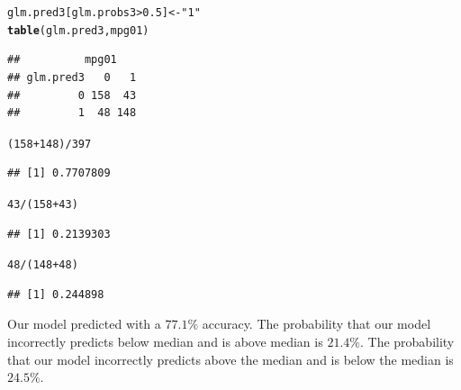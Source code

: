 \documentclass{article}\usepackage[]{graphicx}\usepackage[]{color}
\makeatletter
\newcommand{\hlnum}[1]{\textcolor[rgb]{0.686,0.059,0.569}{#1}}%
\newcommand{\hlstr}[1]{\textcolor[rgb]{0.192,0.494,0.8}{#1}}%
\newcommand{\hlopt}[1]{\textcolor[rgb]{0,0,0}{#1}}%
\newcommand{\hlstd}[1]{\textcolor[rgb]{0.345,0.345,0.345}{#1}}%
\newcommand{\hlkwb}[1]{\textcolor[rgb]{0.69,0.353,0.396}{#1}}%
\newcommand{\hlkwd}[1]{\textcolor[rgb]{0.737,0.353,0.396}{\textbf{#1}}}%
\newenvironment{kframe}{%
 \def\at@end@of@kframe{}%
 \ifinner\ifhmode%
  \def\at@end@of@kframe{\end{minipage}}%
  \begin{minipage}{\columnwidth}%
 \fi\fi%
 \def\FrameCommand##1{\hskip\@totalleftmargin \hskip-\fboxsep
 \colorbox{shadecolor}{##1}\hskip-\fboxsep
     \hskip-\linewidth \hskip-\@totalleftmargin \hskip\columnwidth}%
 \MakeFramed {\advance\hsize-\width
   \@totalleftmargin\z@ \linewidth\hsize
   \@setminipage}}%
 {\par\unskip\endMakeFramed%
 \at@end@of@kframe}
\newenvironment{knitrout}{}{} %
\makeatother
\begin{document}
\begin{enumerate}[(a)]
\begin{knitrout}
\begin{kframe}
\begin{alltt}
\hlstd{glm.pred3[glm.probs3}\hlopt{>}\hlnum{0.5}\hlstd{]}\hlkwb{<-}\hlstr{"1"}
\hlkwd{table}\hlstd{(glm.pred3,mpg01)}
\end{alltt}
\begin{verbatim}
##          mpg01
## glm.pred3   0   1
##         0 158  43
##         1  48 148
\end{verbatim}
\begin{alltt}
\hlstd{(}\hlnum{158}\hlopt{+}\hlnum{148}\hlstd{)}\hlopt{/}\hlnum{397}
\end{alltt}
\begin{verbatim}
## [1] 0.7707809
\end{verbatim}
\begin{alltt}
\hlnum{43}\hlopt{/}\hlstd{(}\hlnum{158}\hlopt{+}\hlnum{43}\hlstd{)}
\end{alltt}
\begin{verbatim}
## [1] 0.2139303
\end{verbatim}
\begin{alltt}
\hlnum{48}\hlopt{/}\hlstd{(}\hlnum{148}\hlopt{+}\hlnum{48}\hlstd{)}
\end{alltt}
\begin{verbatim}
## [1] 0.244898
\end{verbatim}
\end{kframe}
\end{knitrout}

Our model predicted with a $77.1\%$ accuracy. The probability that our model incorrectly predicts below median and is above median is $21.4\%$. The probability that our model incorrectly predicts above the median and is below the median is $24.5\%$. 

\end{enumerate}
\end{document}
